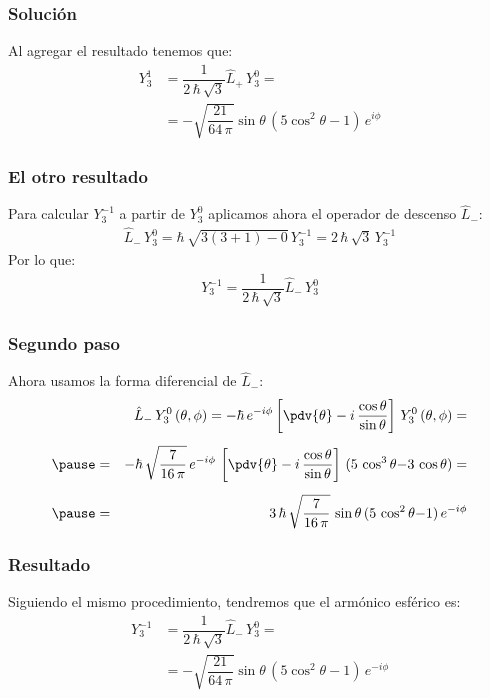 \begin{frame}
\frametitle{Solución}
Al agregar el resultado tenemos que:
\begin{align*}
Y_{3}^{1} &= \dfrac{1}{2 \, \hbar \, \sqrt{3}} \hat{L}_{+} \, Y_{3}^{0} = \\[0.5em]
&= - \sqrt{\dfrac{21}{64 \, \pi}} \sin \theta \, (5 \cos^{2} \theta - 1) \, e^{i \phi}
\end{align*}
\end{frame}
\begin{frame}
\frametitle{El otro resultado}
Para calcular $Y_{3}^{-1}$ a partir de $Y_{3}^{0}$ aplicamos ahora el operador de descenso $\hat{L}_{-}$:
\begin{align*}
\hat{L}_{-} \, Y_{3}^{0} = \hbar \, \sqrt{3 (3 + 1) - 0} \, Y_{3}^{-1} = 2 \, \hbar \, \sqrt{3} \, Y_{3}^{-1}
\end{align*}
Por lo que:
\begin{align}
Y_{3}^{-1} = \dfrac{1}{2 \, \hbar \, \sqrt{3}} \hat{L}_{-} \, Y_{3}^{0}
\label{eq:ecuacion_05_199}
\end{align}
\end{frame}
\begin{frame}
\frametitle{Segundo paso}
Ahora usamos la forma diferencial de $\hat{L}_{-}$:
\begin{eqnarray*}
&{}&\hat{L}_{-} \, Y_{3}^{0} \, (\theta, \phi) = - \hbar \, e^{-i \phi} \left[ \pdv{\theta}  - i \, \dfrac{\cos \theta}{\sin \theta} \right] \, Y_{3}^{0} \, (\theta, \phi) = \\[0.5em] \pause
&=& -\hbar \, \sqrt{\dfrac{7}{16 \, \pi}} \, e^{-i \phi} \, \left[ \pdv{\theta} - i \, \dfrac{\cos \theta}{\sin \theta} \right] \, (5 \, \cos^{3} \theta {-} 3 \, \cos \theta) = \\[0.5em] \pause
&=& 3 \, \hbar \, \sqrt{\dfrac{7}{16 \, \pi}} \, \sin \theta \, (5 \, \cos^{2} \theta {-} 1) \, e^{-i \phi}
\end{eqnarray*}
\end{frame}
\begin{frame}
\frametitle{Resultado}
Siguiendo el mismo procedimiento, tendremos que el armónico esférico es:
\begin{align*}
Y_{3}^{-1} &= \dfrac{1}{2 \, \hbar \, \sqrt{3}} \hat{L}_{-} \, Y_{3}^{0} = \\[0.5em]
&= - \sqrt{\dfrac{21}{64 \, \pi}} \sin \theta \, (5 \cos^{2} \theta - 1) \, e^{-i \phi}
\end{align*}
\end{frame}
